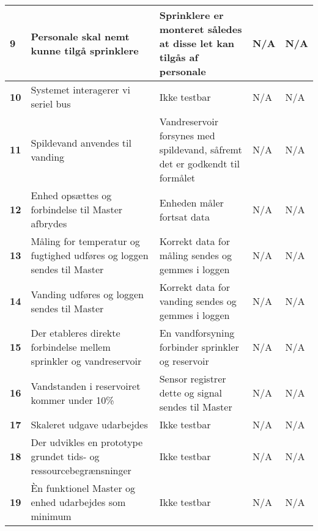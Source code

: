 \begin{center}
\begin{longtable}{|p{}|p{}|p{}|p{}|p{}|}
\textbf{9}	&Personale skal nemt kunne tilgå sprinklere
			&Sprinklere er monteret således at disse let kan tilgås af personale
			&N/A
			&N/A \\ \hline 
			
\textbf{10}	&Systemet interagerer vi seriel bus
			&Ikke testbar
			&N/A
			&N/A \\ \hline 
			
\textbf{11}	&Spildevand anvendes til vanding
			&Vandreservoir forsynes med spildevand, såfremt det er godkendt til formålet
			&N/A
			&N/A \\ \hline 
			
\textbf{12}	&Enhed opsættes og forbindelse til Master afbrydes
			& Enheden måler fortsat data
			&N/A
			&N/A \\ \hline 
			
\textbf{13}	&Måling for temperatur og fugtighed udføres og loggen sendes til Master
			&Korrekt data for måling sendes og gemmes i loggen
			&N/A
			&N/A \\ \hline 
			
\textbf{14}	&Vanding udføres og loggen sendes til Master
			&Korrekt data for vanding sendes og gemmes i loggen
			&N/A
			&N/A \\ \hline 
			
\textbf{15}	&Der etableres direkte forbindelse mellem sprinkler og vandreservoir
			&En vandforsyning forbinder sprinkler og reservoir
			&N/A
			&N/A \\ \hline 
			
\textbf{16}	&Vandstanden i reservoiret kommer under 10\%
			&Sensor registrer dette og signal sendes til Master
			&N/A
			&N/A \\ \hline 
			
\textbf{17}	&Skaleret udgave udarbejdes
			&Ikke testbar
			&N/A
			&N/A \\ \hline 
			
\textbf{18}	&Der udvikles en prototype grundet tids- og ressourcebegrænsninger
			&Ikke testbar
			&N/A
			&N/A \\ \hline 
			
\textbf{19}	&Èn funktionel Master og enhed udarbejdes som minimum
			&Ikke testbar
			&N/A
			&N/A \\ \hline 
			
\end{longtable}
	\label{ATIFKrav} 
\end{center}


